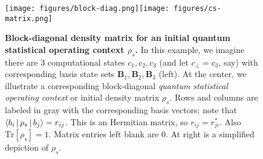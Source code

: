 \documentclass[preprints,article,accept,moreauthors,pdftex]{Definitions/mdpi}
\begin{document}
\begin{figure}[t] %
\widefigure
\centerline{\texttt{[image: figures/block-diag.png]}\hspace{1 cm}\texttt{[image: figures/cs-matrix.png]}}
\caption{\textbf{Block-diagonal density matrix for an initial quantum statistical operating context $\rho_s$.} In this example, we imagine there are 3 computational states $c_1,c_2,c_3$ (and let $c_\bot=c_3$, say) with corresponding basis state sets $\boldsymbol{B}_1,\boldsymbol{B}_2,\boldsymbol{B}_3$ (left). At the center, we illustrate a corresponding block-diagonal \textit{quantum statistical operating context} or initial density matrix $\rho_s$. Rows and columns are labeled in gray with the corresponding basis vectors; note that $\Braket{b_i|\rho_s|b_j}=r_{ij}$. This is an Hermitian matrix, so $r_{ij}=r_{ji}^*$. Also $\mathrm{Tr}\left[\rho_s\right]=1$. Matrix entries left blank are 0. At right is a simplified depiction of $\rho_s$.\label{fig:block-diag}}
\end{figure}   
\end{document}
